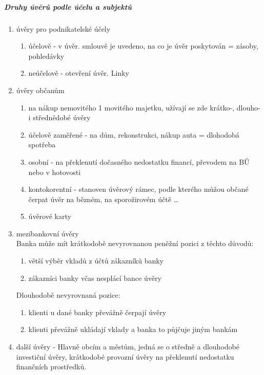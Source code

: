 \subparagraph{Druhy úvěrů podle účelu a subjektů}
\begin{enumerate}
    \item úvěry pro podnikatelské účely
        \begin{enumerate}
            \item účelově - v úvěr. smlouvě je uvedeno, na co je úvěr poskytován = zásoby, pohledávky
            \item neúčelově - otevření úvěr. Linky
        \end{enumerate}
    \item úvěry občanům
        \begin{enumerate}
            \item na nákup nemovitého 1 movitého majetku, užívají se zde krátko-, dlouho- i střednědobé úvěry
            \item účelově zaměřené - na dům, rekonstrukci, nákup auta = dlohodobá spotřeba
            \item osobní - na překlenutí dočasného nedostatku financí, převodem na BŮ nebo v hotovosti
            \item kontokorentní - stanoven úvěrový rámec, podle kterého můžou občané čerpat úvěr na bězném, na sporožirovém účtě \ldots
            \item úvěrové karty     
        \end{enumerate}
    \item mezibankovní úvěry \\
        Banka může mít krátkodobě nevyrovnanou peněžní pozici z těchto důvodů:
        \begin{enumerate}        
            \item větší výběr vkladů z účtů zákazníků banky
            \item zákazníci banky včas nesplácí bance úvěry
        \end{enumerate}
        Dlouhodobě nevyrovnaná pozice:
        \begin{enumerate}        
            \item klienti u dané banky převážně čerpají úvěry
            \item klienti převážně ukládají vklady a banka to půjčuje jiným bankám
        \end{enumerate}
    \item další úvěry - Hlavně obcím a městům, jedná se o středně a dlouhodobé investiční úvěry, krátkodobé provozní úvěry na překlenutí nedostatku finančních prostředků.
\end{enumerate}

